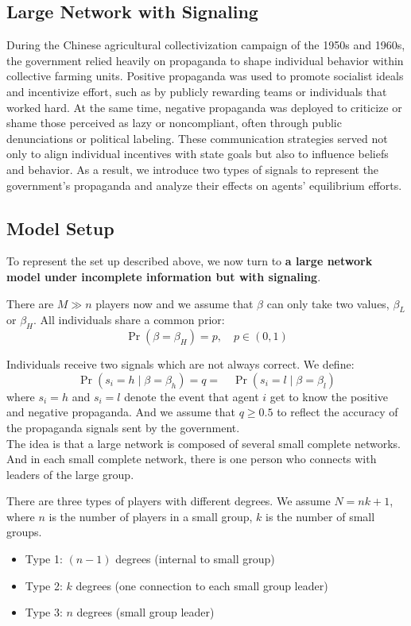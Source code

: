 \documentclass[12pt]{article}
\begin{document}
\subsection{Large Network with Signaling}
During the Chinese agricultural collectivization campaign of the 1950s and 1960s, the government relied heavily on propaganda to shape individual behavior within collective farming units. Positive propaganda was used to promote socialist ideals and incentivize effort, such as by publicly rewarding teams or individuals that worked hard. At the same time, negative propaganda was deployed to criticize or shame those perceived as lazy or noncompliant, often through public denunciations or political labeling. These communication strategies served not only to align individual incentives with state goals but also to influence beliefs and behavior. As a result, we introduce two types of signals to represent the government's propaganda and analyze their effects on agents' equilibrium efforts.

\subsection*{Model Setup}
To represent the set up described above, we now turn to \textbf{a large network model under incomplete information but with signaling}.

There are $M \gg n$ players now and we assume that $\beta$ can only take two values, $\beta_L$ or $\beta_H$.  
All individuals share a common prior:
\[
\Pr(\beta = \beta_H) = p, \quad p \in (0,1)
\]

Individuals receive two signals which are not always correct.  
We define:
\[
\Pr(s_i = h \mid \beta = \beta_h) = q = \quad \Pr(s_i = l \mid \beta = \beta_l) 
\]
where $s_i = h$ and $s_i = l$ denote the event that agent $i$ get to know the positive and negative propaganda. And we assume that $q \geq 0.5$ to reflect the accuracy of the propaganda signals sent by the government.\\

The idea is that a large network is composed of several small complete networks.  
And in each small complete network, there is one person who connects with leaders of the large group.

There are three types of players with different degrees.  
We assume $N = nk + 1$, where $n$ is the number of players in a small group, $k$ is the number of small groups.

\begin{itemize}
    \item Type 1: $(n-1)$ degrees (internal to small group)
    \item Type 2: $k$ degrees (one connection to each small group leader)
    \item Type 3: $n$ degrees (small group leader)
\end{itemize}
\end{document}
